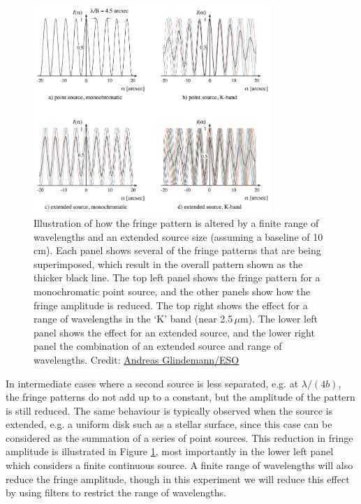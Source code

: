 \documentclass[11pt]{article}
\begin{document}
\begin{figure}[h]
    \centering
    \includegraphics[width=0.8\textwidth]{doc/coherence.png}
    \caption{Illustration of how the fringe pattern is altered by a finite range of wavelengths and an extended source size (assuming a baseline of 10\,cm). Each panel shows several of the fringe patterns that are being superimposed, which result in the overall pattern shown as the thicker black line. The top left panel shows the fringe pattern for a monochromatic point source, and the other panels show how the fringe amplitude is reduced. The top right shows the effect for a range of wavelengths in the `K' band (near 2.5\,$\mu$m). The lower left panel shows the effect for an extended source, and the lower right panel the combination of an extended source and range of wavelengths. Credit: \href{https://www.eso.org/sci/facilities/paranal/telescopes/vlti/tuto/tutorial_spatial_interferometry.pdf}{Andreas Glindemann/ESO}}
    \label{fig:coherence}
\end{figure}

In intermediate cases where a second source is less separated, e.g. at $\lambda/(4b)$, the fringe patterns do not add up to a constant, but the amplitude of the pattern is still reduced. The same behaviour is typically observed when the source is extended, e.g. a uniform disk such as a stellar surface, since this case can be considered as the summation of a series of point sources. This reduction in fringe amplitude is illustrated in Figure \ref{fig:coherence}, most importantly in the lower left panel which considers a finite continuous source. A finite range of wavelengths will also reduce the fringe amplitude, though in this experiment we will reduce this effect by using filters to restrict the range of wavelengths.
\end{document}
